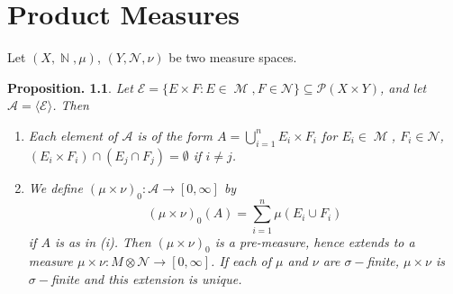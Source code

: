 \documentclass[11pt, a4paper]{memoir}
\DeclareMathOperator{\N}{{\mathbb{N}}}
\theoremstyle{change}
\newtheorem{proposition}[theorem]{Proposition.}
\theoremstyle{plain}
\theoremstyle{nonumberplain}
\DeclareMathOperator{\M}{{\mathcal{M}}}
\begin{document}
\chapter{Product Measures}
Let $(X,\N,\mu)$, $(Y,\mathcal{N},\nu)$ be two measure spaces.
\begin{proposition}
    Let $\mathcal{E}=\{E\times F:E\in\M,F\in\mathcal{N}\}\subseteq\mathcal{P}(X\times Y)$, and let $\mathcal{A}=\langle\mathcal{E}\rangle$.
    Then
    \begin{enumerate}[nolistsep]
        \item Each element of $\mathcal{A}$ is of the form $A=\bigcup_{i=1}^n E_i\times F_i$ for $E_i\in\M$, $F_i\in\mathcal{N}$, $(E_i\times F_i)\cap (E_j\cap F_j)=\emptyset$ if $i\neq j$.
        \item We define $(\mu\times\nu)_0:\mathcal{A}\to[0,\infty]$ by
            \begin{equation*}
                (\mu\times\nu)_0(A)=\sum_{i=1}^n\mu(E_i\cup F_i)
            \end{equation*}
            if $A$ is as in (i).
            Then $(\mu\times\nu)_0$ is a pre-measure, hence extends to a measure $\mu\times\nu:M\otimes\mathcal{N}\to[0,\infty]$.
            If each of $\mu$ and $\nu$ are $\sigma-$finite, $\mu\times\nu$ is $\sigma-$finite and this extension is unique.
    \end{enumerate}
\end{proposition}
\end{document}
